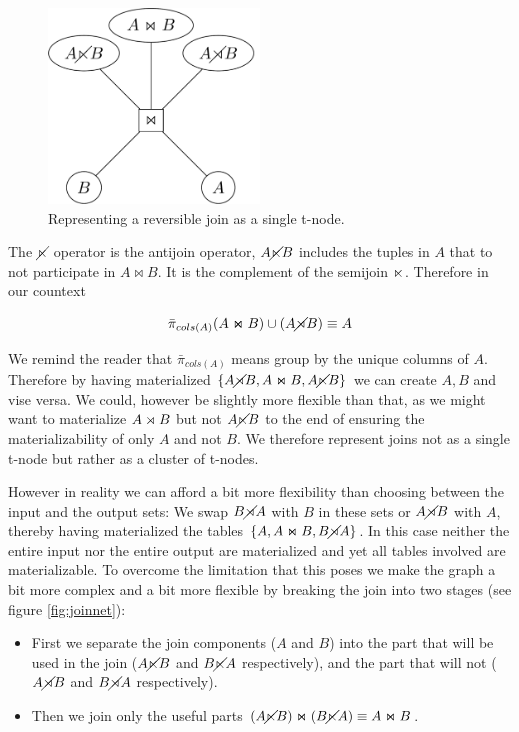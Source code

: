 \begin{figure}[H]
  \centering
  \includegraphics[width=0.5\textwidth]{./imgs/naivejoinnet.pdf}
  \caption{\label{fig:org78bb458}Representing a reversible join as a single t-node.}
\end{figure}

The \(\cancel\ltimes\) operator is the antijoin operator, \(A \cancel\ltimes B\)
includes the tuples in \(A\) that to not participate in \(A \Join B\). It
is the complement of the semijoin \(\ltimes\). Therefore in our
countext

\[ \bar{\pi}_{cols(A)}(A \Join B) \cup (A \cancel\rtimes B) \equiv A \]

We remind the reader that \(\bar{\pi}_{cols(A)}\) means group by the
unique columns of \(A\). Therefore by having materialized \(\{A \cancel\rtimes B, A
\Join B, A \cancel\ltimes B\}\) we can create \({A,B}\) and vise versa. We could,
however be slightly more flexible than that, as we might want to
materialize \(A \rtimes B\) but not \(A \cancel\ltimes B\) to the end of ensuring
the materializability of only \(A\) and not \(B\). We therefore
represent joins not as a single t-node but rather as a cluster of
t-nodes.

However in reality we can afford a bit more flexibility than
choosing between the input and the output sets: We swap \(B \cancel\rtimes A\)
with \(B\) in these sets or \(A \cancel\rtimes B\) with \(A\), thereby having
materialized the tables \(\{A, A \Join B, B \cancel\rtimes A\}\). In this case
neither the entire input nor the entire output are materialized
and yet all tables involved are materializable. To overcome the
limitation that this poses we make the graph a bit more complex
and a bit more flexible by breaking the join into two stages (see
figure \ref{fig:joinnet}):

\begin{itemize}
\item First we separate the join components (\(A\) and \(B\)) into the
  part that will be used in the join (\(A \cancel\ltimes B\) and \(B \cancel\ltimes A\)
  respectively), and the part that will not (\(A \cancel\rtimes B\) and
  \(B \cancel\rtimes A\) respectively).
\item Then we join only the useful parts
  \((A \cancel\ltimes B) \Join (B \cancel\ltimes A) \equiv A \Join B\).
\end{itemize}


